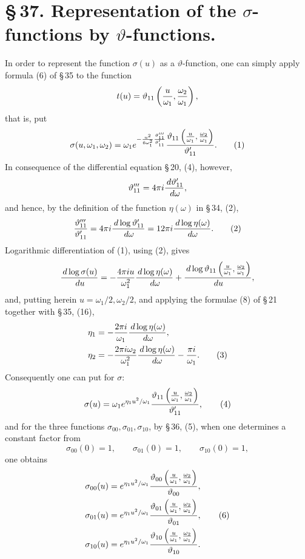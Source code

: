 \documentclass[11pt]{article}
\providecommand{\dd}{\,d}
\providecommand{\tht}{\vartheta}
\begin{document}
\section*{\S\,37. Representation of the $\sigma$-functions by $\vartheta$-functions.}

In order to represent the function $\sigma(u)$ as a $\vartheta$-function, one can simply apply formula (6) of \S\,35 to the function
\[
t(u)=\tht_{11}\left({u\over\omega_1},{\omega_2\over\omega_1}\right),
\]
that is, put
\begin{equation}
\sigma(u,
\omega_1,
\omega_2)
=\omega_1 e^{-{u^2\over6\omega_1^2}{\tht'''_{11}\over\tht'_{11}}}
{\tht_{11}\left({u\over\omega_1},{\omega_2\over\omega_1}\right)
\over \tht'_{11}}. \tag{1}
\end{equation}
In consequence of the differential equation \S\,20, (4), however,
\[
\tht'''_{11}=4\pi i{\dd\tht'_{11}\over \dd\omega},
\]
and hence, by the definition of the function $\eta(\omega)$ in \S\,34, (2),
\begin{equation}
{\tht'''_{11}\over\tht'_{11}}
=4\pi i{\dd\log\tht'_{11}\over\dd\omega}
=12\pi i{\dd\log\eta(\omega)\over\dd\omega}. \tag{2}
\end{equation}
Logarithmic differentiation of (1), using (2), gives
\[
{\dd\log\sigma(u)\over\dd u}
=-{4\pi i u\over\omega_1^2}{\dd\log\eta(\omega)\over\dd\omega}
+{\dd\log\tht_{11}\left({u\over\omega_1},{\omega_2\over\omega_1}\right)
\over\dd u},
\]
and, putting herein $u=\omega_1/2,\omega_2/2$, and applying the formulae (8) of \S\,21 together with \S\,35, (16),
\begin{align}
\eta_1&=-{2\pi i\over\omega_1}{\dd\log\eta(\omega)\over\dd\omega},\notag\\
\eta_2&=-{2\pi i\omega_2\over\omega_1^2}{\dd\log\eta(\omega)\over\dd\omega}-{\pi i\over\omega_1}. \tag{3}
\end{align}
Consequently one can put for $\sigma$:
\begin{equation}
\sigma(u)=\omega_1 e^{\eta_1u^2/\omega_1}
{\tht_{11}\left({u\over\omega_1},{\omega_2\over\omega_1}\right)
\over\tht'_{11}}, \tag{4}
\end{equation}
and for the three functions $\sigma_{00},\sigma_{01},\sigma_{10}$, by \S\,36, (5), when one determines a constant factor from
\begin{equation}
\sigma_{00}(0)=1,
\qquad
\sigma_{01}(0)=1,
\qquad
\sigma_{10}(0)=1, \tag{5}
\end{equation}
one obtains
\begin{align}
\sigma_{00}(u)&=e^{\eta_1u^2/\omega_1}
{\tht_{00}\left({u\over\omega_1},{\omega_2\over\omega_1}\right)
\over\tht_{00}},\notag\\
\sigma_{01}(u)&=e^{\eta_1u^2/\omega_1}
{\tht_{01}\left({u\over\omega_1},{\omega_2\over\omega_1}\right)
\over\tht_{01}}, \tag{6}\\
\sigma_{10}(u)&=e^{\eta_1u^2/\omega_1}
{\tht_{10}\left({u\over\omega_1},{\omega_2\over\omega_1}\right)
\over\tht_{10}}.\notag
\end{align}
\end{document}
